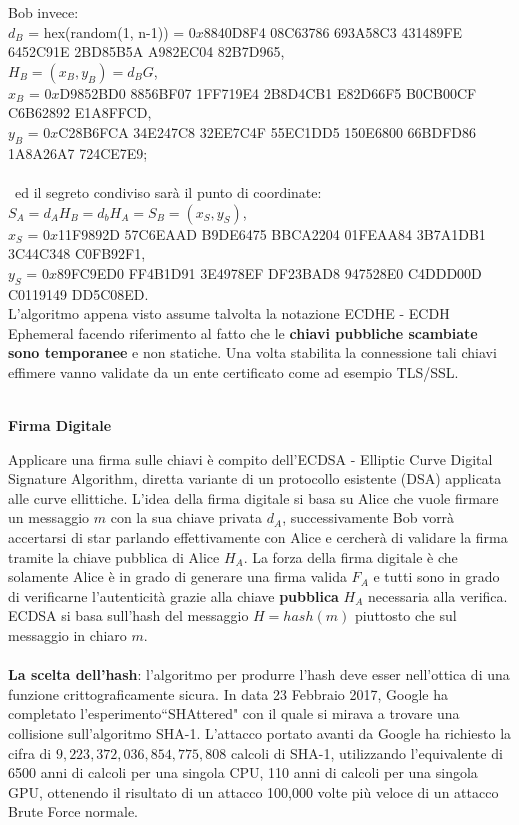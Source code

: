 \documentclass[a4paper,12pt]{tesiinfo}
\begin{document}
Bob invece:\\
$d_B$ = hex(random(1, n-1)) = $0x$8840D8F4 08C63786 693A58C3 431489FE 6452C91E 2BD85B5A A982EC04 82B7D965,\\
$H_B = (x_B, y_B) = d_BG$,\\
$x_B$ = $0x$D9852BD0 8856BF07 1FF719E4 2B8D4CB1 E82D66F5 B0CB00CF C6B62892 E1A8FFCD,\\
$y_B$ = $0x$C28B6FCA 34E247C8 32EE7C4F 55EC1DD5 150E6800 66BDFD86 1A8A26A7 724CE7E9;\\
\\\
ed il segreto condiviso sar\`a il punto di coordinate:\\
$S_A = d_AH_B = d_bH_A = S_B = (x_S, y_S)$,\\
$x_S$ = $0x$11F9892D 57C6EAAD B9DE6475 BBCA2204 01FEAA84 3B7A1DB1 3C44C348 C0FB92F1,\\
$y_S$ = $0x$89FC9ED0 FF4B1D91 3E4978EF DF23BAD8 947528E0 C4DDD00D C0119149 DD5C08ED.
\\
L'algoritmo appena visto assume talvolta la notazione ECDHE - ECDH Ephemeral facendo riferimento al fatto che le \textbf{chiavi pubbliche scambiate sono temporanee} e non statiche. Una volta stabilita la connessione tali chiavi effimere vanno validate da un ente certificato come ad esempio TLS/SSL.
\\
\\
\begin{center}
    \textbf{Firma Digitale}
\end{center}
Applicare una firma sulle chiavi \`e compito dell'ECDSA - Elliptic Curve Digital Signature Algorithm, diretta variante di un protocollo esistente (DSA) applicata alle curve ellittiche. L'idea della firma digitale si basa su Alice che vuole firmare un messaggio $m$ con la sua chiave privata $d_A$, successivamente Bob vorr\`a accertarsi di star parlando effettivamente con Alice e cercher\`a di validare la firma tramite la chiave pubblica di Alice $H_A$. La forza della firma digitale \`e che solamente Alice \`e in grado di generare una firma valida $F_A$ e tutti sono in grado di verificarne l'autenticit\`a grazie alla chiave \textbf{pubblica} $H_A$ necessaria alla verifica.
\\
ECDSA si basa sull'hash del messaggio $H = hash(m)$ piuttosto che sul messaggio in chiaro $m$.
\\
\\
\textbf{La scelta dell'hash}: l'algoritmo per produrre l'hash deve esser nell'ottica di una funzione crittograficamente sicura. In data 23 Febbraio 2017, Google ha completato l'esperimento``SHAttered" con il quale si mirava a trovare una collisione sull'algoritmo SHA-1. L'attacco portato avanti da Google ha richiesto la cifra di $9,223,372,036,854,775,808$ calcoli di SHA-1, utilizzando l'equivalente di 6500 anni di calcoli per una singola CPU, 110 anni di calcoli per una singola GPU, ottenendo il risultato di un attacco 100,000 volte pi\`u veloce di un attacco Brute Force normale.
\end{document}
